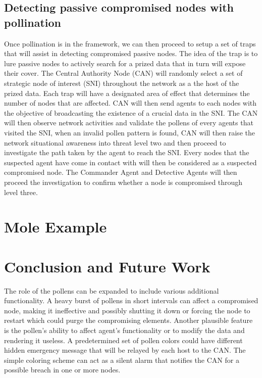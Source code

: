 \documentclass{acm_proc_article-sp}
\begin{document}
\subsection{Detecting passive compromised nodes with pollination}
Once pollination is in the framework, we can then proceed to setup a set of traps that will assist in detecting compromised passive nodes. The idea of the trap is to lure passive nodes to actively search for a  prized data that in turn will expose their cover. The Central Authority Node (CAN) will randomly select a set of strategic node of interest (SNI) throughout the network as a the host of the prized data. Each trap will have a designated area of effect that determines the number of nodes that are affected. CAN will then send agents to each nodes with the objective of broadcasting the existence of a crucial data in the SNI. The CAN will then observe network activities and validate the pollens of every agents that visited the SNI, when an invalid pollen pattern is found, CAN will then raise the network situational awareness into threat level two and then proceed to investigate the path taken by the agent to reach the SNI. Every nodes that the suspected agent have come in contact with will then be considered as a suspected compromised node. The Commander Agent and Detective Agents will then proceed the investigation to confirm whether a node is compromised through level three. 

\section{Mole Example}

\section{Conclusion and Future Work}
The role of the pollens can be expanded to include various additional functionality. A heavy burst of pollens in short intervals can affect a compromised node, making it ineffective and possibly shutting it down or forcing the node to restart which could purge the compromising elements. Another plausible feature is the pollen’s ability to affect agent’s functionality or to modify the data and rendering it useless. A predetermined set of pollen colors could have different hidden emergency message that will be relayed by each host to the CAN. The simple coloring scheme can act as a silent alarm that notifies the CAN for a possible breach in one or more nodes.
\end{document}

